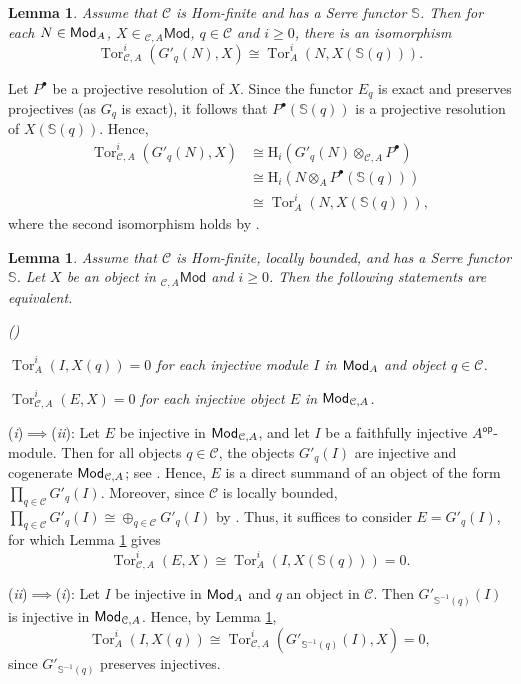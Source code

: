 \documentclass{amsart}
\theoremstyle{bfupright head,slanted body}
\theoremstyle{bfupright head,upright body}
\theoremstyle{fixed bf head,slanted body}
\newtheorem{lem}[res]{Lemma}            \newtheorem*{lem*}{Lemma}
\theoremstyle{fixed bf head,upright body}
\theoremstyle{numbered paragraph}
\newlength{\thmlistleft}        %
\newlength{\thmlistright}       %
\newlength{\thmlistpartopsep}   %
\newlength{\thmlisttopsep}      %
\newlength{\thmlistparsep}      %
\newlength{\thmlistitemsep}     %
\newcounter{eqc}
\newenvironment{eqc}{\begin{list}{\upshape (\textit{\roman{eqc}})}%
		{\usecounter{eqc}%
			\setlength{\leftmargin}{\thmlistleft}%
			\setlength{\labelwidth}{\thmlistleft}%
			\setlength{\rightmargin}{\thmlistright}%
			\setlength{\partopsep}{\thmlistpartopsep}%
			\setlength{\topsep}{\thmlisttopsep}%
			\setlength{\parsep}{\thmlistparsep}%
			\setlength{\itemsep}{\thmlistitemsep}}}%
	{\end{list}}%
\newenvironment{prf*}[1][Proof]{%
	\begin{proof}[\bf #1]
		\setcounter{equation}{0}
		\renewcommand{\theequation}{\arabic{equation}}}
	{\end{proof}
}
\newcommand{\eqclbl}[1]{{\upshape(\textit{#1})}}
\newcommand{\proofofimp}[3][:]{\mbox{\eqclbl{#2}$\!\implies\!$\eqclbl{#3}#1}}
\numberwithin{equation}{res}
\newcommand{\Mod}[1]{{_{#1}\mathsf{Mod}}}
\newcommand{\Tor}[4][]{\operatorname{Tor}_{#2}^{#1}(#3,#4)}
\newcommand{\C}{\mathcal{C}}
\newcommand{\is}{\cong}
\newcommand{\rMod}[1]{{\sf{Mod}}_{#1}}
\newcommand{\Aop}{A^{\mathsf{op}}}
\begin{document}
\begin{lem}\label{Tor formula}
Assume that $\C$ is Hom-finite and has a Serre functor $\mathbb{S}$. Then for each $N\in \rMod{A}$,  $X\in\Mod{\C,A}$, $q\in\C$ and $i\geqslant0$, there is an isomorphism
\[
\Tor[i]{\C,A}{G'_{q}(N)}{X}\is\Tor[i]{A}{N}{X(\mathbb{S}(q))}.
\]
\end{lem}

\begin{prf*}
Let $P^{\bullet}$ be a projective resolution of $X$. Since the functor $E_q$ is exact and preserves projectives (as $G_q$ is exact), it follows that  $P^{\bullet}(\mathbb{S}(q))$ is a projective resolution of $X(\mathbb{S}(q))$. Hence,
\begin{align*}
\Tor[i]{\C,A}{G'_{q}(N)}{X}
&\cong \mathrm{H}_{i}(G'_{q}(N)\otimes_{\C,A}P^{\bullet})     \\
&\cong \mathrm{H}_{i}(N\otimes_{A}P^{\bullet}(\mathbb{S}(q))) \\
&\cong \Tor[i]{A}{N}{X(\mathbb{S}(q))},
\end{align*}
where the second isomorphism holds by \cite[Lemma 3.9]{DLLM}.
\end{prf*}

\begin{lem}\label{Tor vanish}
Assume that $\C$ is Hom-finite, locally bounded, and has a Serre functor $\mathbb{S}$. Let $X$ be an object in $\Mod{\C,A}$ and $i\geqslant0$. Then the following statements are equivalent.
\begin{eqc}
\item $\Tor[i]{A}{I}{X(q)}=0$ for each injective module $I$ in $\rMod{A}$ and object $q\in\C$.
\item $\Tor[i]{\C,A}{E}{X}=0$ for each injective object $E$ in $\rMod{\C,A}$.
\end{eqc}
\end{lem}

\begin{prf*}
\proofofimp{i}{ii} Let $E$ be injective in $\rMod{\C,A}$, and let $I$ be a faithfully injective $\Aop$-module. Then for all objects $q\in\C$, the objects $G'_{q}(I)$ are injective and cogenerate $\rMod{\C,A}$; see \cite[Proposition 3.12]{HJ21}. Hence, $E$ is a direct summand of an object of the form $\prod_{q\in\C}G'_{q}(I)$. Moreover, since $\C$ is locally bounded, $\prod_{q\in\C}G'_{q}(I)\cong \oplus_{q\in\C}G'_{q}(I)$ by \cite[Proposition 3.7]{HJ23}. Thus, it suffices to consider $E=G'_{q}(I)$, for which Lemma \ref{Tor formula} gives
$$\Tor[i]{\C,A}{E}{X}\is\Tor[i]{A}{I}{X(\mathbb{S}(q))}=0.$$

\proofofimp{ii}{i} Let $I$ be injective in $\rMod{A}$ and $q$ an object in $\C$. Then $G'_{\mathbb{S}^{-1}(q)}(I)$ is injective in $\rMod{\C,A}$.
Hence, by Lemma \ref{Tor formula},
\[\Tor[i]{A}{I}{X(q)}\is\Tor[i]{\C,A}{G'_{\mathbb{S}^{-1}(q)}(I)}{X}=0,\]
since $G'_{\mathbb{S}^{-1}(q)}$ preserves injectives.
\end{prf*}
\end{document}
